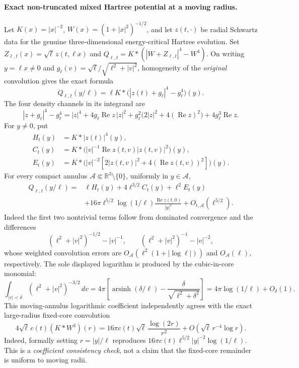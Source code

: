 \paragraph{Exact non-truncated mixed Hartree potential at a moving radius.}
Let \(K(x)=|x|^{-2}\), \(W(x)=(1+|x|^2)^{-1/2}\), and let
\(z(t,\cdot)\) be radial Schwartz data for the genuine
three-dimensional energy-critical Hartree evolution. Set
\(Z_{\ell,t}(x)=\sqrt{\ell}\,z(t,\ell x)\) and
\(Q_{\ell,t}=K*(|W+Z_{\ell,t}|^4-W^4)\). On writing
\(y=\ell x\ne0\) and
\(g_\ell(v)=\sqrt{\ell}/\sqrt{\ell^2+|v|^2}\), homogeneity
of the \emph{original} convolution gives the exact formula
\[
 Q_{\ell,t}(y/\ell)=
 \ell K*\bigl(|z(t)+g_\ell|^4-g_\ell^4\bigr)(y).
\]
The four density channels in its integrand are
\[
 |z+g_\ell|^4-g_\ell^4
 =|z|^4+4g_\ell\operatorname{Re}z\,|z|^2+
 g_\ell^2\bigl(2|z|^2+4(\operatorname{Re}z)^2\bigr)
 +4g_\ell^3\operatorname{Re}z.
\]
For \(y\ne0\), put
\[
 \begin{aligned}
 H_t(y)&=K*|z(t)|^4(y),\\
 C_t(y)&=K*\bigl(|v|^{-1}\operatorname{Re}z(t,v)|z(t,v)|^2\bigr)(y),\\
 E_t(y)&=K*\bigl(|v|^{-2}
       [2|z(t,v)|^2+4(\operatorname{Re}z(t,v))^2]\bigr)(y).
 \end{aligned}
\]
For every compact annulus \(\mathcal A\Subset\mathbb R^3\setminus\{0\}\),
uniformly in \(y\in\mathcal A\),
\[
 \begin{aligned}
 Q_{\ell,t}(y/\ell)={}&
 \ell H_t(y)+4\ell^{3/2}C_t(y)+\ell^2E_t(y)\\
 &+16\pi\ell^{5/2}\log(1/\ell)
   \frac{\operatorname{Re}z(t,0)}{|y|^2}
   +O_{t,\mathcal A}(\ell^{5/2}).
 \end{aligned}
\]
Indeed the first two nontrivial terms follow from dominated
convergence and the differences
\[
 (\ell^2+|v|^2)^{-1/2}-|v|^{-1},
 \qquad
 (\ell^2+|v|^2)^{-1}-|v|^{-2},
\]
whose weighted convolution errors are
\(O_{\mathcal A}(\ell^2(1+|\log\ell|))\) and
\(O_{\mathcal A}(\ell)\), respectively. The sole displayed
logarithm is produced by the cubic-in-core monomial:
\[
 \int_{|v|<\delta}(\ell^2+|v|^2)^{-3/2}\,dv
 =4\pi\left[\operatorname{arsinh}(\delta/\ell)
       -\frac{\delta}{\sqrt{\ell^2+\delta^2}}\right]
 =4\pi\log(1/\ell)+O_\delta(1).
\]
This moving-annulus logarithmic coefficient independently agrees
with the exact large-radius fixed-core convolution
\[
 4\sqrt\ell\,c(t)(K*W^3)(r)
 =16\pi c(t)\sqrt\ell\,\frac{\log(2r)}{r^2}
   +O(\sqrt\ell\,r^{-4}\log r).
\]
Indeed, formally setting \(r=|y|/\ell\) reproduces
\(16\pi c(t)\ell^{5/2}|y|^{-2}\log(1/\ell)\).
This is a \emph{coefficient consistency check}, not a claim that the
fixed-core remainder is uniform to moving radii.

